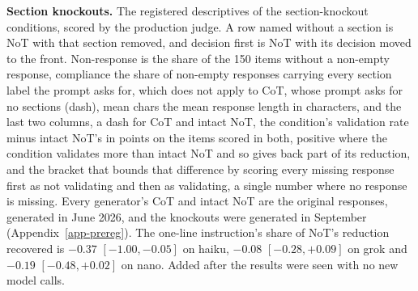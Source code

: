 \begin{table}[t]
\centering
\footnotesize
\caption{\textbf{Section knockouts.} The registered descriptives of the section-knockout conditions,
scored by the production judge. A row named without a section is NoT with
that section removed, and decision first is NoT with its decision moved to the
front. Non-response is the share of the 150 items
without a non-empty response, compliance the share of non-empty responses
carrying every section label the prompt asks for, which does not apply to
CoT, whose prompt asks for no sections (dash), mean chars the mean response
length in characters, and the last two columns, a dash for CoT and intact NoT,
the condition's validation rate minus intact NoT's in points on the items
scored in both, positive where the condition validates more than intact NoT
and so gives back part of its reduction, and the bracket that bounds that
difference by scoring every missing response first as not validating and
then as validating, a single number where no response is missing. Every
generator's CoT and intact NoT are the original responses, generated in June
2026, and the knockouts were generated in September
(Appendix~\ref{app-prereg}). The one-line
instruction's share of NoT's reduction recovered is $-0.37$ $[-1.00, -0.05]$
on haiku, $-0.08$ $[-0.28, +0.09]$ on grok and $-0.19$ $[-0.48, +0.02]$ on
nano. Added after the results were seen with no new model calls.}
\label{tab-app-knockout}

\end{table}
